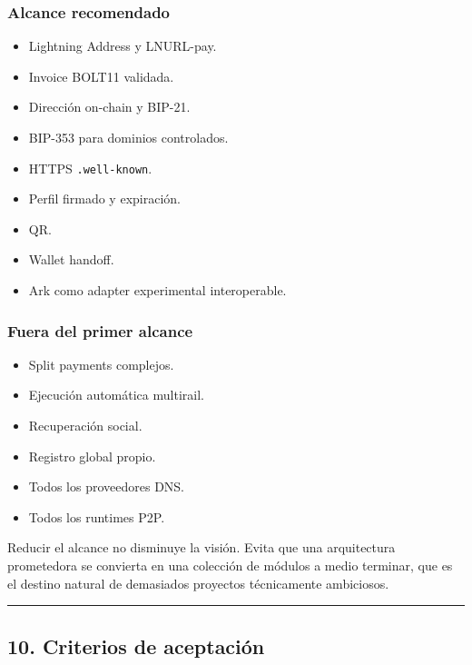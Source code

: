 \documentclass[
]{article}
\providecommand{\tightlist}{%
  \setlength{\itemsep}{0pt}\setlength{\parskip}{0pt}}
\begin{document}
\hypertarget{alcance-recomendado}{%
\subsubsection{Alcance recomendado}\label{alcance-recomendado}}

\begin{itemize}
\tightlist
\item
  Lightning Address y LNURL-pay.
\item
  Invoice BOLT11 validada.
\item
  Dirección on-chain y BIP-21.
\item
  BIP-353 para dominios controlados.
\item
  HTTPS \texttt{.well-known}.
\item
  Perfil firmado y expiración.
\item
  QR.
\item
  Wallet handoff.
\item
  Ark como adapter experimental interoperable.
\end{itemize}

\hypertarget{fuera-del-primer-alcance}{%
\subsubsection{Fuera del primer
alcance}\label{fuera-del-primer-alcance}}

\begin{itemize}
\tightlist
\item
  Split payments complejos.
\item
  Ejecución automática multirail.
\item
  Recuperación social.
\item
  Registro global propio.
\item
  Todos los proveedores DNS.
\item
  Todos los runtimes P2P.
\end{itemize}

Reducir el alcance no disminuye la visión. Evita que una arquitectura
prometedora se convierta en una colección de módulos a medio terminar,
que es el destino natural de demasiados proyectos técnicamente
ambiciosos.

\begin{center}\rule{0.5\linewidth}{0.5pt}\end{center}

\hypertarget{criterios-de-aceptaciuxf3n}{%
\subsection{10. Criterios de
aceptación}\label{criterios-de-aceptaciuxf3n}}
\end{document}
